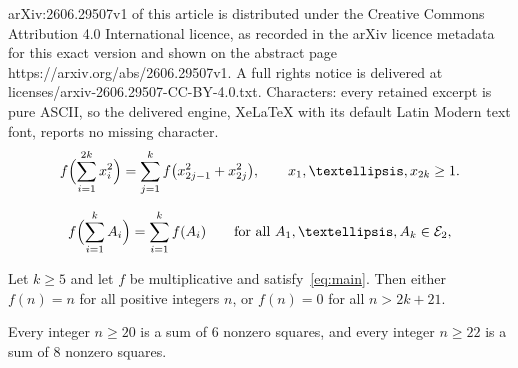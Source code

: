\documentclass[10pt,a4paper]{amsart}
\newcommand{\E}{\mathcal{E}}
\begin{document}
arXiv:2606.29507v1 of this article is distributed under the Creative Commons Attribution 4.0 International licence, as recorded in the arXiv licence metadata for this exact version and shown on the abstract page https://arxiv.org/abs/2606.29507v1. A full rights notice is delivered at licenses/arxiv-2606.29507-CC-BY-4.0.txt. Characters: every retained excerpt is pure ASCII, so the delivered engine, XeLaTeX with its default Latin Modern text font, reports no missing character.
\begin{equation}\label{eq:main}
   f\Bigl(\sum_{i=1}^{2k}x_i^2\Bigr)=\sum_{j=1}^{k}f\bigl(x_{2j-1}^2+x_{2j}^2\bigr),
   \qquad x_1,\dots,x_{2k}\ge 1 .
\end{equation}

\begin{equation}\label{eq:reduced}
   f\Bigl(\sum_{i=1}^{k}A_i\Bigr)=\sum_{i=1}^{k}f(A_i)
   \qquad\text{for all } A_1,\dots,A_k\in\E_2 ,
\end{equation}

\begin{theorem}\label{thm:kge5-intro}
Let $k \ge 5$ and let $f$ be multiplicative and satisfy~\eqref{eq:main}. Then either $f(n) = n$ for all positive integers $n$, or $f(n) = 0$ for all $n > 2k + 21$.
\end{theorem}

\begin{corollary}\label{cor:6sqand8sq}
Every integer $n \ge 20$ is a sum of $6$ nonzero squares, and every integer
$n \ge 22$ is a sum of $8$ nonzero squares.
\end{corollary}
\end{document}
